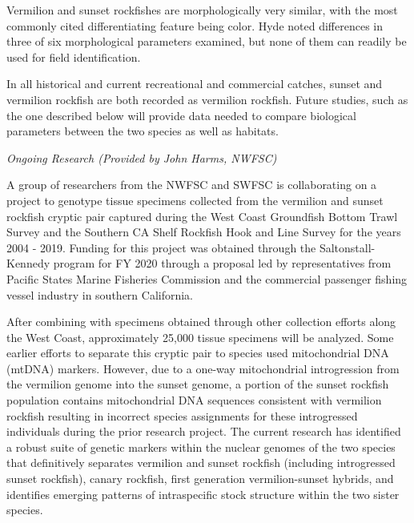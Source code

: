 \documentclass[11pt,
  english,
  a4paper,
]{article}
\begin{document}
Vermilion and sunset rockfishes are morphologically very similar, with the most commonly cited differentiating feature being color. Hyde noted differences in three of six morphological parameters examined, but none of them can readily be used for field identification.

In all historical and current recreational and commercial catches, sunset and vermilion rockfish are both recorded as vermilion rockfish. Future studies, such as the one described below will provide data needed to compare biological parameters between the two species as well as habitats.

\emph{Ongoing Research (Provided by John Harms, NWFSC)}

A group of researchers from the NWFSC and SWFSC is collaborating on a project to genotype tissue specimens collected from the vermilion and sunset rockfish cryptic pair captured during the West Coast Groundfish Bottom Trawl Survey and the Southern CA Shelf Rockfish Hook and Line Survey for the years 2004 - 2019. Funding for this project was obtained through the Saltonstall-Kennedy program for FY 2020 through a proposal led by representatives from Pacific States Marine Fisheries Commission and the commercial passenger fishing vessel industry in southern California.

After combining with specimens obtained through other collection efforts along the West Coast, approximately 25,000 tissue specimens will be analyzed. Some earlier efforts to separate this cryptic pair to species used mitochondrial DNA (mtDNA) markers. However, due to a one-way mitochondrial introgression from the vermilion genome into the sunset genome, a portion of the sunset rockfish population contains mitochondrial DNA sequences consistent with vermilion rockfish resulting in incorrect species assignments for these introgressed individuals during the prior research project. The current research has identified a robust suite of genetic markers within the nuclear genomes of the two species that definitively separates vermilion and sunset rockfish (including introgressed sunset rockfish), canary rockfish, first generation vermilion-sunset hybrids, and identifies emerging patterns of intraspecific stock structure within the two sister species.
\end{document}
